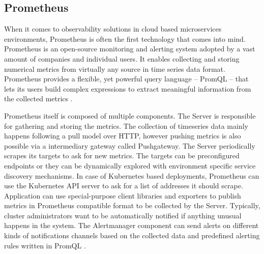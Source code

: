 \subsection{Prometheus}

When it comes to observability solutions in cloud based microservices environments, Prometheus is often the first technology that comes into mind. Prometheus is an open-source monitoring and alerting system adopted by a vast amount of companies and individual users. It enables collecting and storing numerical metrics from virtually any source in time series data format. Prometheus provides a flexible, yet powerful query language -- PromQL -- that lets its users build complex expressions to extract meaningful information from the collected metrics \cite{Prometheus}.

Prometheus itself is composed of multiple components. The Server is responsible for gathering and storing the metrics. The collection of timeseries data mainly happens following a pull model over HTTP, however pushing metrics is also possible via a intermediary gateway called Pushgateway. The Server periodically scrapes its targets to ask for new metrics. The targets can be preconfigured endpoints or they can be dynamically explored with environment specific service discovery mechanisms. In case of Kubernetes based deployments, Prometheus can use the Kubernetes API server to ask for a list of addresses it should scrape. Application can use special-purpose client libraries and exporters to publish metrics in Prometheus compatible format to be collected by the Server. Typically, cluster administrators want to be automatically notified if anything unusual happens in the system. The Alertmanager component can send alerts on different kinds of notifications channels based on the collected data and predefined alerting rules written in PromQL \cite{Prometheus}.


